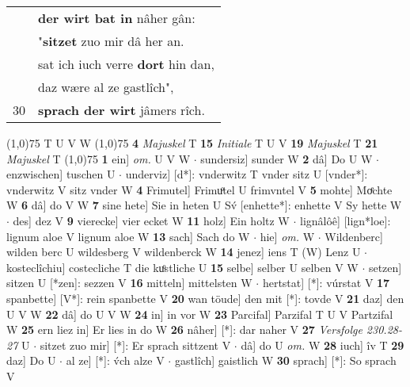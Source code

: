 \documentclass[8pt,a4paper,notitlepage]{article}
\begin{document}
\begin{table}[ht]
\begin{minipage}[t]{0.5\linewidth}
\begin{tabular}{rl}
 & \textbf{der wirt bat in} nâher gân:\\ 
 & "\textbf{sitzet} zuo mir dâ her an.\\ 
 & sat ich iuch verre \textbf{dort} hin dan,\\ 
 & daz wære al ze gastlîch",\\ 
30 & \textbf{sprach der wirt} jâmers rîch.\\ 
\end{tabular}
\scriptsize
\line(1,0){75} \newline
T U V W \newline
\line(1,0){75} \newline
\textbf{4} \textit{Majuskel} T  \textbf{15} \textit{Initiale} T U V  \textbf{19} \textit{Majuskel} T  \textbf{21} \textit{Majuskel} T  \newline
\line(1,0){75} \newline
\textbf{1} ein] \textit{om.} U V W  $\cdot$ sundersiz] sunder W \textbf{2} dâ] Do U W  $\cdot$ enzwischen] tuschen U  $\cdot$ underviz] [d*]: vnderwitz T vnder sitz U [vnder*]: vnderwitz V sitz vnder W \textbf{4} Frimutel] Frimuͦtel U frimvntel V \textbf{5} mohte] Moͤchte W \textbf{6} dâ] do V W \textbf{7} sine hete] Sie in heten U Sv́ [enhette*]: enhette V Sy hette W  $\cdot$ des] dez V \textbf{9} vierecke] vier ecket W \textbf{11} holz] Ein holtz W  $\cdot$ lignâlôê] [lign*loe]: lignum aloe V lignum aloe W \textbf{13} sach] Sach do W  $\cdot$ hie] \textit{om.} W  $\cdot$ Wildenberc] wilden berc U wildesberg V wildenberck W \textbf{14} jenez] iens T (W) Lenz U  $\cdot$ kosteclîchiu] costecliche T die kuͦstliche U \textbf{15} selbe] selber U selben V W  $\cdot$ setzen] sitzen U [*zen]: sezzen V \textbf{16} mitteln] mittelsten W  $\cdot$ hertstat] [*]: vúrstat V \textbf{17} spanbette] [V*]: rein spanbette V \textbf{20} wan töude] den mit [*]: tovde V \textbf{21} daz] den U V W \textbf{22} dâ] do U V W \textbf{24} in] in vor W \textbf{23} Parcifal] Parzifal T U V Partzifal W \textbf{25} ern liez in] Er lies in do W \textbf{26} nâher] [*]: dar naher V \textbf{27} \textit{Versfolge 230.28-27} U   $\cdot$ sitzet zuo mir] [*]: Er sprach sittzent V  $\cdot$ dâ] do U \textit{om.} W \textbf{28} iuch] îv T \textbf{29} daz] Do U  $\cdot$ al ze] [*]: v́ch alze V  $\cdot$ gastlîch] gaistlich W \textbf{30} sprach] [*]: So sprach V \newline
\end{minipage}
\end{table}
\end{document}
